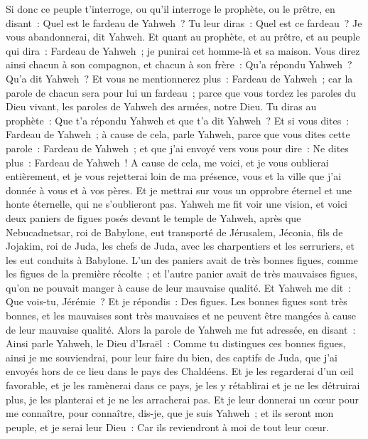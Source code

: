 \begin{multicols}{2}
Si donc ce peuple t'interroge, ou qu'il interroge le prophète, ou le prêtre, en disant~: Quel est le fardeau de Yahweh~? Tu leur diras~: Quel est ce fardeau~? Je vous abandonnerai, dit Yahweh.
Et quant au prophète, et au prêtre, et au peuple qui dira~: Fardeau de Yahweh~; je punirai cet homme-là et sa maison.
Vous direz ainsi chacun à son compagnon, et chacun à son frère~: Qu'a répondu Yahweh~? Qu'a dit Yahweh~?
Et vous ne mentionnerez plus~: Fardeau de Yahweh~; car la parole de chacun sera pour lui un fardeau~; parce que vous tordez les paroles du Dieu vivant, les paroles de Yahweh des armées, notre Dieu.
Tu diras au prophète~: Que t'a répondu Yahweh et que t'a dit Yahweh~?
Et si vous dites~: Fardeau de Yahweh~; à cause de cela, parle Yahweh, parce que vous dites cette parole~: Fardeau de Yahweh~; et que j'ai envoyé vers vous pour dire~: Ne dites plus~: Fardeau de Yahweh~!
A cause de cela, me voici, et je vous oublierai entièrement, et je vous rejetterai loin de ma présence, vous et la ville que j'ai donnée à vous et à vos pères.
Et je mettrai sur vous un opprobre éternel et une honte éternelle, qui ne s'oublieront pas.
\VerseOne{}Yahweh me fit voir une vision, et voici deux paniers de figues posés devant le temple de Yahweh, après que Nebucadnetsar, roi de Babylone, eut transporté de Jérusalem, Jéconia, fils de Jojakim, roi de Juda, les chefs de Juda, avec les charpentiers et les serruriers, et les eut conduits à Babylone.
L'un des paniers avait de très bonnes figues, comme les figues de la première récolte~; et l'autre panier avait de très mauvaises figues, qu'on ne pouvait manger à cause de leur mauvaise qualité.
Et Yahweh me dit~: Que vois-tu, Jérémie~? Et je répondis~: Des figues. Les bonnes figues sont très bonnes, et les mauvaises sont très mauvaises et ne peuvent être mangées à cause de leur mauvaise qualité.
Alors la parole de Yahweh me fut adressée, en disant~:
Ainsi parle Yahweh, le Dieu d'Israël~: Comme tu distingues ces bonnes figues, ainsi je me souviendrai, pour leur faire du bien, des captifs de Juda, que j'ai envoyés hors de ce lieu dans le pays des Chaldéens.
Et je les regarderai d'un œil favorable, et je les ramènerai dans ce pays, je les y rétablirai et je ne les détruirai plus, je les planterai et je ne les arracherai pas.
Et je leur donnerai un cœur pour me connaître, pour connaître, dis-je, que je suis Yahweh~; et ils seront mon peuple, et je serai leur Dieu~: Car ils reviendront à moi de tout leur cœur.

\end{multicols}
